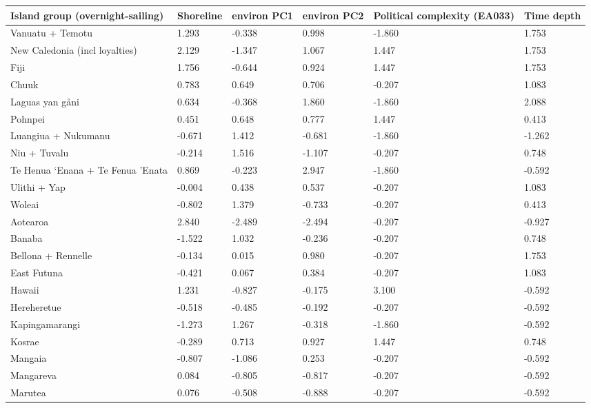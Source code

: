 \begin{longtable}{p{4.5cm}p{1.7cm}p{1.7cm}p{1.7cm}p{1.7cm}p{1.7cm}}
  \toprule
Island group (overnight-sailing) & Shoreline & environ PC1 & environ PC2 & Political complexity (EA033) & Time depth \\ 
  \midrule
Vanuatu + Temotu & 1.293 & -0.338 & 0.998 & -1.860 & 1.753 \\ 
  New Caledonia (incl loyalties) & 2.129 & -1.347 & 1.067 & 1.447 & 1.753 \\ 
  Fiji & 1.756 & -0.644 & 0.924 & 1.447 & 1.753 \\ 
  Chuuk & 0.783 & 0.649 & 0.706 & -0.207 & 1.083 \\ 
  Laguas yan gåni & 0.634 & -0.368 & 1.860 & -1.860 & 2.088 \\ 
  Pohnpei & 0.451 & 0.648 & 0.777 & 1.447 & 0.413 \\ 
  Luangiua + Nukumanu & -0.671 & 1.412 & -0.681 & -1.860 & -1.262 \\ 
  Niu + Tuvalu & -0.214 & 1.516 & -1.107 & -0.207 & 0.748 \\ 
  Te Henua ‘Enana + Te Fenua ’Enata & 0.869 & -0.223 & 2.947 & -1.860 & -0.592 \\ 
  Ulithi + Yap & -0.004 & 0.438 & 0.537 & -0.207 & 1.083 \\ 
  Woleai & -0.802 & 1.379 & -0.733 & -0.207 & 0.413 \\ 
  Aotearoa & 2.840 & -2.489 & -2.494 & -0.207 & -0.927 \\ 
  Banaba & -1.522 & 1.032 & -0.236 & -0.207 & 0.748 \\ 
  Bellona + Rennelle & -0.134 & 0.015 & 0.980 & -0.207 & 1.753 \\ 
  East Futuna & -0.421 & 0.067 & 0.384 & -0.207 & 1.083 \\ 
  Hawaii & 1.231 & -0.827 & -0.175 & 3.100 & -0.592 \\ 
  Hereheretue & -0.518 & -0.485 & -0.192 & -0.207 & -0.592 \\ 
  Kapingamarangi & -1.273 & 1.267 & -0.318 & -1.860 & -0.592 \\ 
  Kosrae & -0.289 & 0.713 & 0.927 & 1.447 & 0.748 \\ 
  Mangaia & -0.807 & -1.086 & 0.253 & -0.207 & -0.592 \\ 
  Mangareva & 0.084 & -0.805 & -0.817 & -0.207 & -0.592 \\ 
  Marutea & 0.076 & -0.508 & -0.888 & -0.207 & -0.592 \\ 

\end{longtable}
